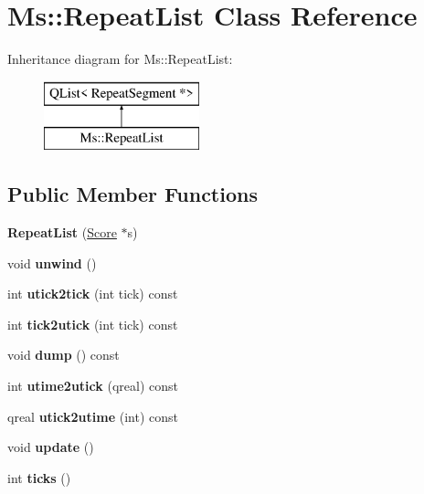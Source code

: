 \hypertarget{class_ms_1_1_repeat_list}{}\section{Ms\+:\+:Repeat\+List Class Reference}
\label{class_ms_1_1_repeat_list}
Inheritance diagram for Ms\+:\+:Repeat\+List\+:\begin{figure}[H]
\begin{center}
\leavevmode
\includegraphics[height=2.000000cm]{class_ms_1_1_repeat_list}
\end{center}
\end{figure}
\subsection*{Public Member Functions}
\begin{DoxyCompactItemize}
\item 
\mbox{\label{class_ms_1_1_repeat_list_a6c4081e24c5c1052d6b332bca8849ea9}} 
{\bfseries Repeat\+List} (\hyperlink{class_ms_1_1_score}{Score} $\ast$s)
\item 
\mbox{\label{class_ms_1_1_repeat_list_a776e93b4ea68f132c2a4a4e567d27e43}} 
void {\bfseries unwind} ()
\item 
\mbox{\label{class_ms_1_1_repeat_list_a3950c55342fe7afa1b9e2d66209c4b84}} 
int {\bfseries utick2tick} (int tick) const
\item 
\mbox{\label{class_ms_1_1_repeat_list_a85c9f5c6573154f1749e31f09432ccc1}} 
int {\bfseries tick2utick} (int tick) const
\item 
\mbox{\label{class_ms_1_1_repeat_list_ae60754b5c9fa51dba77aebf3ffd0ef17}} 
void {\bfseries dump} () const
\item 
\mbox{\label{class_ms_1_1_repeat_list_a0b70dfc0823f767043d75f7a2bd2408d}} 
int {\bfseries utime2utick} (qreal) const
\item 
\mbox{\label{class_ms_1_1_repeat_list_ac1dad5dba570da19c1488e5847aab56f}} 
qreal {\bfseries utick2utime} (int) const
\item 
\mbox{\label{class_ms_1_1_repeat_list_ae7e826301f2400402f6b8ed07ea245c0}} 
void {\bfseries update} ()
\item 
\mbox{\label{class_ms_1_1_repeat_list_a081cfc598fc70525575d6a3245148cb5}} 
int {\bfseries ticks} ()
\end{DoxyCompactItemize}


